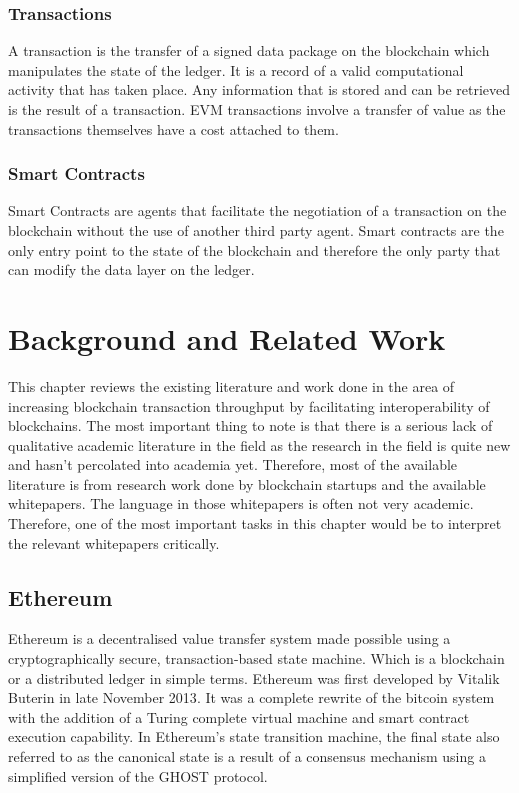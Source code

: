 \documentclass[a4paper,twoside,phd]{BYUPhys}
\begin{document}
\subsection{Transactions}
A transaction is the transfer of a signed data package on the blockchain which manipulates the state of the ledger\cite{ButerinAPLATFORM}. It is a record of a valid computational activity that has taken place. Any information that is stored and can be retrieved is the result of a transaction. EVM transactions involve a transfer of value as the transactions themselves have a cost attached to them\cite{ButerinAPLATFORM}. 
\subsection{Smart Contracts}
Smart Contracts are agents that facilitate the negotiation of a transaction on the blockchain without the use of another third party agent\cite{ButerinAPLATFORM}. Smart contracts are the only entry point to the state of the blockchain and therefore the only party that can modify the data layer on the ledger\cite{ButerinAPLATFORM}.

\chapter{Background and Related Work}
This chapter reviews the existing literature and work done in the area of increasing blockchain transaction throughput by facilitating interoperability of blockchains. The most important thing to note is that there is a serious lack of qualitative academic literature in the field as the research in the field is quite new and hasn't percolated into academia yet. Therefore, most of the available literature is from research work done by blockchain startups and the available whitepapers. The language in those whitepapers is often not very academic. Therefore, one of the most important tasks in this chapter would be to interpret the relevant whitepapers critically.
\section{Ethereum}
Ethereum is a decentralised value transfer system made possible using a cryptographically secure, transaction-based state machine. Which is a blockchain or a distributed ledger in simple terms\cite{ButerinAPLATFORM}. Ethereum was first developed by Vitalik Buterin in late November 2013\cite{ButerinAPLATFORM}. It was a complete rewrite of the bitcoin system with the addition of a Turing complete virtual machine and smart contract execution capability\cite{ButerinAPLATFORM}. In Ethereum's state transition machine, the final state also referred to as the canonical state is a result of a consensus mechanism using a simplified version of the GHOST protocol\cite{Wood2018ETHEREUM:LEDGER}.
\end{document}
